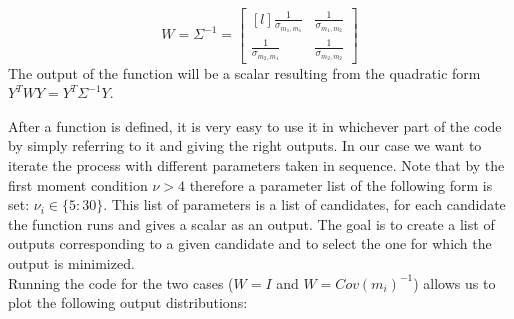 \begin{equation*}
    W=\Sigma^{-1}=
    \begin{bmatrix}[l]
        \frac{1}{\sigma_{m_1,m_1}}    &\frac{1}{\sigma_{m_1,m_2}} \\
        \frac{1}{\sigma_{m_2,m_1}}    &\frac{1}{\sigma_{m_2,m_2}}
    \end{bmatrix}
\end{equation*}
The output of the function will be a scalar resulting from the quadratic form $Y^TWY=Y^T\Sigma^{-1}Y$.
\bigskip\par
After a function is defined, it is very easy to use it in whichever part of the code by simply referring to it and giving the right outputs. In our case we want to iterate the process with different parameters taken in sequence. Note that by the first moment condition $\nu>4$ therefore a parameter list of the following form is set: $\nu_i \in \{5:30\}$. This list of parameters is a list of candidates, for each candidate the function runs and gives a scalar as an output. The goal is to create a list of outputs corresponding to a given candidate and to select the one for which the output is minimized.\\
Running the code for the two cases ($W=I$ and $W=Cov(m_i)^{-1}$) allows us to plot the following output distributions:

